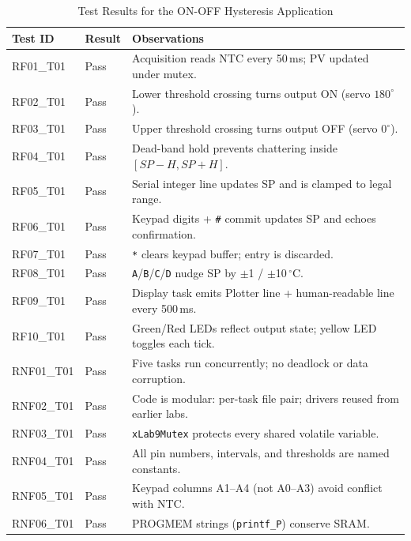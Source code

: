 \documentclass[12pt]{article}
\begin{document}
\begin{table}[H]
\centering
\begin{tabular}{@{}llp{7.5cm}@{}}
\toprule
\textbf{Test ID} & \textbf{Result} & \textbf{Observations} \\
\midrule
RF01\_T01  & Pass & Acquisition reads NTC every 50\,ms; PV updated under mutex. \\
RF02\_T01  & Pass & Lower threshold crossing turns output ON (servo $180^{\circ}$). \\
RF03\_T01  & Pass & Upper threshold crossing turns output OFF (servo $0^{\circ}$). \\
RF04\_T01  & Pass & Dead-band hold prevents chattering inside $[SP-H, SP+H]$. \\
RF05\_T01  & Pass & Serial integer line updates SP and is clamped to legal range. \\
RF06\_T01  & Pass & Keypad digits + \texttt{\#} commit updates SP and echoes confirmation. \\
RF07\_T01  & Pass & \texttt{*} clears keypad buffer; entry is discarded. \\
RF08\_T01  & Pass & \texttt{A}/\texttt{B}/\texttt{C}/\texttt{D} nudge SP by $\pm$1 / $\pm$10\,$^{\circ}$C. \\
RF09\_T01  & Pass & Display task emits Plotter line + human-readable line every 500\,ms. \\
RF10\_T01  & Pass & Green/Red LEDs reflect output state; yellow LED toggles each tick. \\
RNF01\_T01 & Pass & Five tasks run concurrently; no deadlock or data corruption. \\
RNF02\_T01 & Pass & Code is modular: per-task file pair; drivers reused from earlier labs. \\
RNF03\_T01 & Pass & \texttt{xLab9Mutex} protects every shared volatile variable. \\
RNF04\_T01 & Pass & All pin numbers, intervals, and thresholds are named constants. \\
RNF05\_T01 & Pass & Keypad columns A1--A4 (not A0--A3) avoid conflict with NTC. \\
RNF06\_T01 & Pass & PROGMEM strings (\texttt{printf\_P}) conserve SRAM. \\
\bottomrule
\end{tabular}
\caption{Test Results for the ON-OFF Hysteresis Application}
\label{tab:tests}
\end{table}

\end{document}
